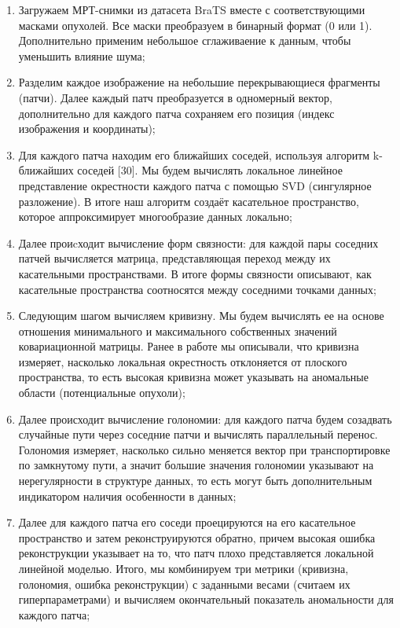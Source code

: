 \documentclass[a4paper,12pt]{extarticle}
\begin{document}
\begin{enumerate}
    \item Загружаем МРТ-снимки из датасета BraTS вместе с соответствующими масками опухолей. Все маски преобразуем в бинарный формат (0 или 1). Дополнительно применим небольшое сглаживаение к данным, чтобы уменьшить влияние шума;

    \item Разделим каждое изображение на небольшие перекрывающиеся фрагменты (патчи). Далее каждый патч преобразуется в одномерный вектор, дополнительно для каждого патча сохраняем его позиция (индекс изображения и координаты);

    \item Для каждого патча находим его ближайших соседей, используя алгоритм k-ближайших соседей [30]. Мы будем вычислять локальное линейное представление окрестности каждого патча с помощью SVD (сингулярное разложение). В итоге наш алгоритм создаёт касательное пространство, которое аппроксимирует многообразие данных локально;
    
    \item Далее проиcходит вычисление форм связности: для каждой пары соседних патчей вычисляется матрица, представляющая переход между их касательными пространствами. В итоге формы связности описывают, как касательные пространства соотносятся между соседними точками данных;

    \item Следующим шагом вычисляем кривизну. Мы будем вычислять ее на основе отношения минимального и максимального собственных значений ковариационной матрицы. Ранее в работе мы описывали, что кривизна измеряет, насколько локальная окрестность отклоняется от плоского пространства, то есть высокая кривизна может указывать на аномальные области (потенциальные опухоли);

    \item Далее происходит вычисление голономии: для каждого патча будем созадвать случайные пути через соседние патчи и вычислять параллельный перенос. Голономия измеряет, насколько сильно меняется вектор при транспортировке по замкнутому пути, а значит большие значения голономии указывают на нерегулярности в структуре данных, то есть могут быть дополнительным индикатором наличия особенности в данных;

    \item Далее для каждого патча его соседи проецируются на его касательное пространство и затем реконструируются обратно, причем высокая ошибка реконструкции указывает на то, что патч плохо представляется локальной линейной моделью. Итого, мы комбинируем три метрики (кривизна, голономия, ошибка реконструкции) с заданными весами (считаем их гиперпараметрами) и вычисляем окончательный показатель аномальности для каждого патча;


\end{enumerate}
\end{document}
